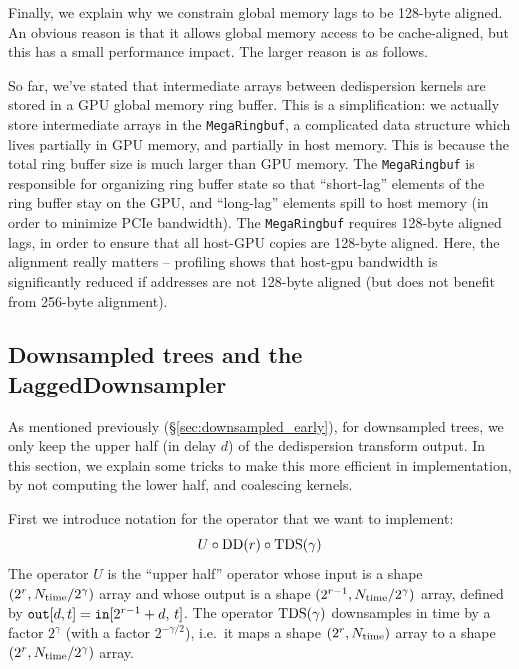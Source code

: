 \documentclass{article}
\numberwithin{equation}{section}   %
\def\DD{{\rm DD}}
\def\TDS{{\rm TDS}}
\begin{document}
Finally, we explain why we constrain global memory lags to be 128-byte aligned.
An obvious reason is that it allows global memory access to be cache-aligned, but
this has a small performance impact.
The larger reason is as follows.

So far, we've stated that intermediate arrays between dedispersion kernels are
stored in a GPU global memory ring buffer.
This is a simplification: we actually store intermediate arrays in the {\tt MegaRingbuf},
a complicated data structure which lives partially in GPU memory, and partially in host
memory.
This is because the total ring buffer size is much larger than GPU memory.
The {\tt MegaRingbuf} is responsible for organizing ring buffer state so that ``short-lag''
elements of the ring buffer stay on the GPU, and ``long-lag'' elements spill to host
memory (in order to minimize PCIe bandwidth).
The {\tt MegaRingbuf} requires 128-byte aligned lags, in order to ensure that all
host-GPU copies are 128-byte aligned.
Here, the alignment really matters -- profiling shows that host-gpu bandwidth is
significantly reduced if addresses are not 128-byte aligned (but does not benefit
from 256-byte alignment).

\subsection{Downsampled trees and the LaggedDownsampler}
\label{ssec:lagged_downsampler}

As mentioned previously (\S\ref{sec:downsampled_early}), for downsampled trees,
we only keep the upper half (in delay $d$) of the dedispersion transform output.
In this section, we explain some tricks to make this more efficient in implementation,
by not computing the lower half, and coalescing kernels.

First we introduce notation for the operator that we want to implement:
\begin{equation}
U \circ \DD(r) \circ \TDS(\gamma)
\end{equation}
The operator $U$ is the ``upper half'' operator whose
input is a shape $(2^r,N_{\rm time}/2^\gamma)$ array and whose output is a shape
$(2^{r-1},N_{\rm time}/2^\gamma)$ array, defined by ${\tt out}[d,t] = {\tt in}[2^{r-1}+d,\,t]$.
The operator $\TDS(\gamma)$ downsamples in time by a factor $2^\gamma$
(with a factor $2^{-\gamma/2}$), i.e.\ it maps a shape $(2^r,N_{\rm time})$ array to a
shape $(2^r,N_{\rm time}/2^\gamma)$ array.
\end{document}
